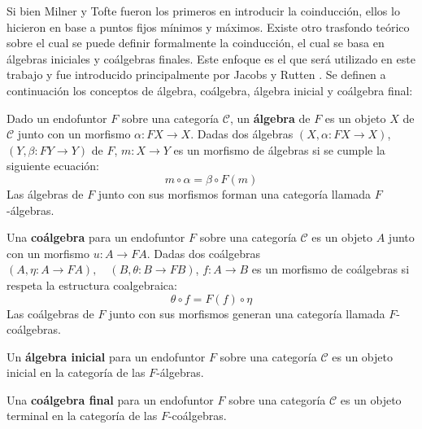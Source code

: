 Si bien Milner y Tofte \cite{milner:1991} fueron los primeros en introducir la coinducción, ellos lo hicieron en base a puntos fijos mínimos y máximos. Existe otro  trasfondo teórico sobre el cual se puede definir formalmente la coinducción, el cual se basa en álgebras iniciales y coálgebras finales. Este enfoque es el que será utilizado en este trabajo y fue introducido principalmente por Jacobs y Rutten \cite{jacobs:2012}. Se definen a continuación los conceptos de álgebra, coálgebra, álgebra inicial y coálgebra final:

\begin{definition}
Dado un endofuntor $\mathit{F}$ sobre una categoría $\mathscr{C}$, un \textbf{álgebra} de $\mathit{F}$ es un objeto $X$ de $\mathscr{C}$ junto con un morfismo $\alpha : \mathit{F}X \rightarrow X$. Dadas dos álgebras $(X, \alpha : \mathit{F}X \rightarrow X)$, $(Y, \beta : \mathit{F}Y \rightarrow Y)$ de $F$, $m : X \rightarrow Y$ es un morfismo de álgebras si se cumple la siguiente ecuación:
\begin{equation*}
m \circ \alpha = \beta \circ \mathit{F}(m)
\end{equation*}
Las álgebras de $\mathit{F}$ junto con sus morfismos forman una categoría llamada $\mathit{F}$-álgebras. 
\end{definition}

\begin{definition}
Una \textbf{coálgebra} para un endofuntor $\mathit{F}$ sobre una categoría $\mathscr{C}$ es un objeto $A$ junto con un morfismo $u : A \rightarrow \mathit{F} A$. Dadas dos coálgebras $(A, \eta : A \rightarrow \mathit{F}A), \quad (B, \theta : B \rightarrow \mathit{F}B)$, $f : A \rightarrow B$ es un morfismo de coálgebras si respeta la estructura coalgebraica: 
\begin{equation*}
\theta \circ f = \mathit{F}(f) \circ \eta
\end{equation*} 
Las coálgebras de $\mathit{F}$ junto con sus morfismos generan una categoría llamada $\mathit{F}$-coálgebras.
\end{definition}

\begin{definition}
Un \textbf{álgebra inicial} para un endofuntor $\mathit{F}$ sobre una categoría $\mathscr{C}$ es un objeto inicial en la categoría de las $\mathit{F}$-álgebras.
\end{definition}

\begin{definition}
Una \textbf{coálgebra final} para un endofuntor $\mathit{F}$ sobre una categoría $\mathscr{C}$ es un objeto terminal en la categoría de las $\mathit{F}$-coálgebras. 
\end{definition}

